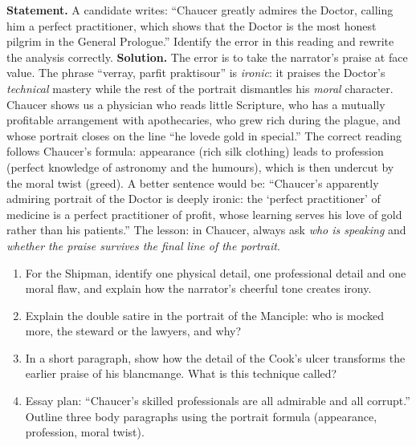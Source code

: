 \documentclass[11pt]{article}
\begin{document}
\begin{exoresolu}
\textbf{Statement.} A candidate writes: ``Chaucer greatly admires the Doctor, calling him a perfect practitioner, which shows that the Doctor is the most honest pilgrim in the General Prologue.'' Identify the error in this reading and rewrite the analysis correctly.
\tcblower
\textbf{Solution.} The error is to take the narrator's praise at face value. The phrase ``verray, parfit praktisour'' is \emph{ironic}: it praises the Doctor's \emph{technical} mastery while the rest of the portrait dismantles his \emph{moral} character. Chaucer shows us a physician who reads little Scripture, who has a mutually profitable arrangement with apothecaries, who grew rich during the plague, and whose portrait closes on the line ``he lovede gold in special.'' The correct reading follows Chaucer's formula: appearance (rich silk clothing) leads to profession (perfect knowledge of astronomy and the humours), which is then undercut by the moral twist (greed). A better sentence would be: ``Chaucer's apparently admiring portrait of the Doctor is deeply ironic: the `perfect practitioner' of medicine is a perfect practitioner of profit, whose learning serves his love of gold rather than his patients.'' The lesson: in Chaucer, always ask \emph{who is speaking} and \emph{whether the praise survives the final line of the portrait}.
\end{exoresolu}

\begin{exercice}
\begin{enumerate}
\item For the Shipman, identify one physical detail, one professional detail and one moral flaw, and explain how the narrator's cheerful tone creates irony.
\item Explain the double satire in the portrait of the Manciple: who is mocked more, the steward or the lawyers, and why?
\item In a short paragraph, show how the detail of the Cook's ulcer transforms the earlier praise of his blancmange. What is this technique called?
\item Essay plan: ``Chaucer's skilled professionals are all admirable and all corrupt.'' Outline three body paragraphs using the portrait formula (appearance, profession, moral twist).
\end{enumerate}
\end{exercice}
\end{document}
